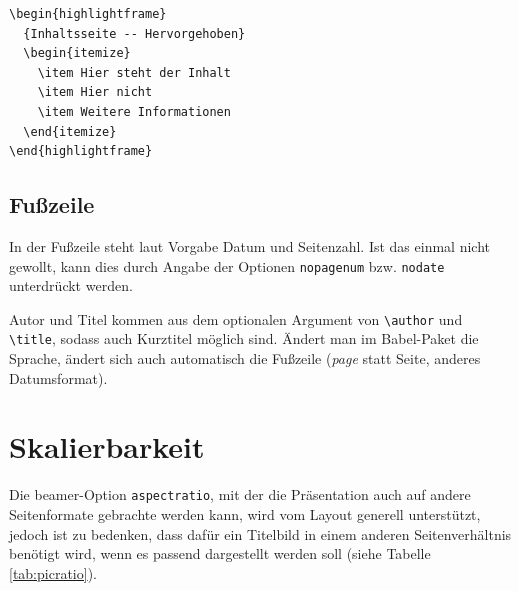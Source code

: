 \documentclass[cmyk,a4paper,colorscheme=green,TUBStitlepage=picture]{tubsreprt}
\begin{document}

\begin{minipage}{0.5\textwidth}
\begin{verbatim}
\begin{highlightframe}
  {Inhaltsseite -- Hervorgehoben}
  \begin{itemize}
    \item Hier steht der Inhalt
    \item Hier nicht
    \item Weitere Informationen
  \end{itemize}
\end{highlightframe}
\end{verbatim}
\end{minipage}
\begin{minipage}{0.5\textwidth}
\end{minipage}

\subsection{Fußzeile}

In der Fußzeile steht laut Vorgabe Datum und Seitenzahl.
Ist das einmal nicht gewollt, kann dies durch Angabe der Optionen
\lstinline{nopagenum} bzw. \lstinline{nodate} unterdrückt werden.

Autor und Titel kommen aus dem optionalen Argument von \lstinline{\author}
und \lstinline{\title}, sodass auch Kurztitel möglich sind.
Ändert man im Babel-Paket die Sprache, ändert sich auch automatisch
die Fußzeile (\textit{page} statt Seite, anderes Datumsformat).


\section{Skalierbarkeit}

Die beamer-Option \lstinline{aspectratio}, mit der die Präsentation auch auf
andere Seitenformate gebrachte werden kann, wird vom Layout generell
unterstützt, jedoch ist zu bedenken, dass dafür ein Titelbild in einem anderen
Seitenverhältnis benötigt wird, wenn es passend dargestellt werden soll
(siehe Tabelle \ref{tab:picratio}).
\end{document}
